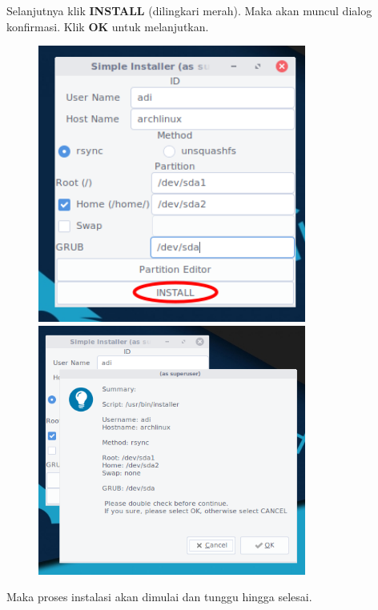 \documentclass[12pt,]{article}
\begin{document}
	Selanjutnya klik \textbf{INSTALL} (dilingkari merah).
	Maka akan muncul dialog konfirmasi.
	Klik \textbf{OK} untuk melanjutkan.
	
	\newpage
	\begin{figure}[h]
		\centering
		\includegraphics[width=250pt]{installhdd/step_17}
		\includegraphics[width=250pt]{installhdd/step_18}
	\end{figure}

	Maka proses instalasi akan dimulai dan tunggu hingga selesai.
	
\end{document}
